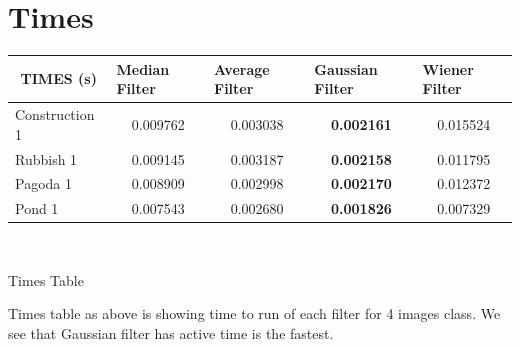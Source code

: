 \section*{Times}
\vspace{2cm}
\begin{center}

\begin{tabular}{|l|l|l|c|l|l|c|l|l|c|l|l|c|l|l|}
\hline
\multicolumn{3}{|c|}{TIMES (s)}      & \multicolumn{3}{l|}{Median Filter} & \multicolumn{3}{l|}{Average Filter} & \multicolumn{3}{l|}{Gaussian Filter}   & \multicolumn{3}{l|}{Wiener Filter} \\ \hline
\multicolumn{3}{|l|}{Construction 1} & \multicolumn{3}{c|}{0.009762}      & \multicolumn{3}{c|}{0.003038}       & \multicolumn{3}{c|}{\textbf{0.002161}} & \multicolumn{3}{c|}{0.015524}      \\ \hline
\multicolumn{3}{|l|}{Rubbish 1}      & \multicolumn{3}{c|}{0.009145}      & \multicolumn{3}{c|}{0.003187}       & \multicolumn{3}{c|}{\textbf{0.002158}} & \multicolumn{3}{c|}{0.011795}      \\ \hline
\multicolumn{3}{|l|}{Pagoda 1}       & \multicolumn{3}{c|}{0.008909}      & \multicolumn{3}{c|}{0.002998}       & \multicolumn{3}{c|}{\textbf{0.002170}} & \multicolumn{3}{c|}{0.012372}      \\ \hline
\multicolumn{3}{|l|}{Pond 1}         & \multicolumn{3}{c|}{0.007543}      & \multicolumn{3}{c|}{0.002680}       & \multicolumn{3}{c|}{\textbf{0.001826}} & \multicolumn{3}{c|}{0.007329}      \\ \hline
\end{tabular}

\

Times Table
\end{center}
 
Times table as above is showing time to run of each filter for 4 images class. We see that Gaussian filter has active time is the fastest.


